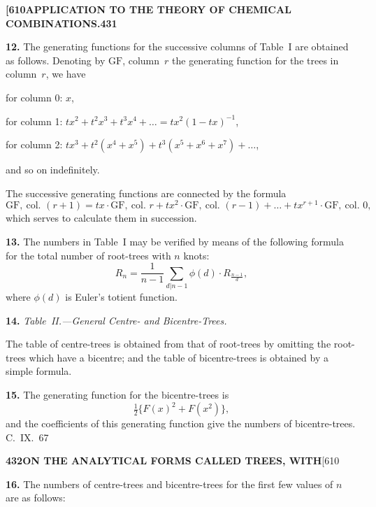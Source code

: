 \documentclass[11pt,a4paper]{book}
\begin{document}
{\newpage
\noindent\textbf{[610}\hspace{\fill}\textbf{APPLICATION TO THE THEORY OF CHEMICAL COMBINATIONS.}\hspace{\fill}\textbf{431}

\noindent\textbf{12.}
The generating functions for the successive columns of Table~I are obtained as follows. Denoting by $\mathrm{GF}$, column~$r$ the generating function for the trees in column~$r$, we have

for column 0: $x$,

for column 1: $tx^2 + t^2x^3 + t^3x^4 + \ldots = tx^2(1-tx)^{-1}$,

for column 2: $tx^3 + t^2(x^4+x^5) + t^3(x^5+x^6+x^7) + \ldots$,

and so on indefinitely.

The successive generating functions are connected by the formula
\[
\mathrm{GF},\ \text{col. }(r+1) = tx \cdot \mathrm{GF},\ \text{col. }r + tx^2 \cdot \mathrm{GF},\ \text{col. }(r-1) + \ldots + tx^{r+1} \cdot \mathrm{GF},\ \text{col. }0,
\]
which serves to calculate them in succession.

\medskip
\noindent\textbf{13.}
The numbers in Table~I may be verified by means of the following formula for the total number of root-trees with $n$ knots:
\[
R_n = \frac{1}{n-1} \sum_{d|n-1} \phi(d) \cdot R_{\frac{n-1}{d}},
\]
where $\phi(d)$ is Euler's totient function.

\medskip
\noindent\textbf{14.}
\textit{Table~II.---General Centre- and Bicentre-Trees.}

The table of centre-trees is obtained from that of root-trees by omitting the root-trees which have a bicentre; and the table of bicentre-trees is obtained by a simple formula.

\medskip
\noindent\textbf{15.}
The generating function for the bicentre-trees is
\[
\tfrac{1}{2}\{F(x)^2 + F(x^2)\},
\]
and the coefficients of this generating function give the numbers of bicentre-trees.
\hfill C.~IX.\ 67

\newpage
\noindent\textbf{432}\hspace{\fill}\textbf{ON THE ANALYTICAL FORMS CALLED TREES, WITH}\hspace{\fill}[610

\noindent\textbf{16.}
The numbers of centre-trees and bicentre-trees for the first few values of $n$ are as follows:

}
\end{document}
